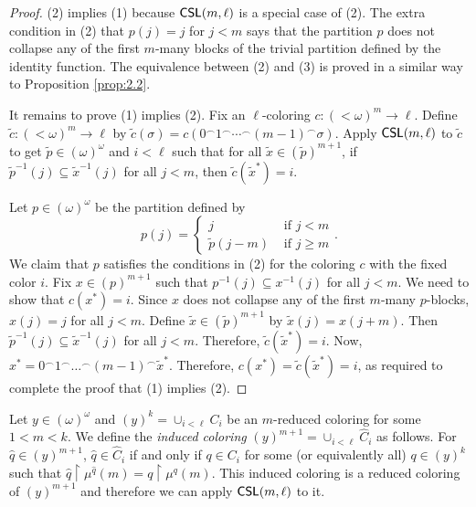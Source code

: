 \documentclass{amsart}
\theoremstyle{definition}
\theoremstyle{remark}
\newcommand{\system}[1]{\mbox{\fontfamily{cmss}\fontshape{n}\fontseries{m}%
    \selectfont#1}}
\newcommand{\CSL}{\system{CSL}}
\newcommand{\concat}{^\smallfrown}
\newcommand{\block}[2]{{#1}^{-1}(#2)}
\begin{document}
\begin{proof}
(2) implies (1) because $\CSL(m,\ell)$ is a special case of (2). The extra condition in (2) that $p(j)=j$ for $j < m$ says that the partition $p$ does not collapse any 
of the first $m$-many blocks of the trivial partition defined by the identity function. The equivalence between (2) and (3) is proved in a similar way to Proposition \ref{prop:2.2}. 

It remains to prove (1) implies (2). Fix an $\ell$-coloring $c: (<\omega)^m \rightarrow \ell$. 
Define $\tilde{c}:(<\omega)^m \rightarrow \ell$ by $\tilde{c}(\sigma) = c(0^{\smallfrown}1^{\smallfrown}\cdots^{\smallfrown}(m-1)^{\smallfrown}\sigma)$. 
Apply $\CSL(m,\ell)$ to $\tilde{c}$ to get $\tilde{p} \in (\omega)^{\omega}$ and $i < \ell$ such that for all $\tilde{x} \in (\tilde{p})^{m+1}$, if 
$\block{\tilde{p}}{j} \subseteq \block{\tilde{x}}{j}$ for all $j<m$, then $\tilde{c}(\tilde{x}^\ast) = i$. 

Let $p \in (\omega)^{\omega}$ be the partition defined by
$$p(j) = \begin{cases} j & \text{ if } j< m \\ \tilde{p}(j-m) &\text{ if } j\geq m\end{cases}.$$
We claim that $p$ satisfies the conditions in (2) for the coloring $c$ with the fixed color $i$.
Fix $x \in (p)^{m+1}$ such that $\block{p}{j} \subseteq \block{x}{j}$ for all $j < m$. We need to show that $c(x^\ast) = i$. 
Since $x$ does not collapse any of the first $m$-many $p$-blocks, 
$x(j)=j$ for all $j < m$.  Define $\tilde x \in (\tilde p)^{m+1}$ by $\tilde x(j) = x(j+m)$.
Then $\block{\tilde{p}}{j} \subseteq 
\block{\tilde{x}}{j}$ for all $j < m$. Therefore, $\tilde{c}(\tilde{x}^\ast) = i$. 
Now, $x^\ast = 0\concat 1 \concat \dots \concat (m-1)\concat \tilde{x}^\ast$.
Therefore, $c(x^\ast) = \tilde{c}(\tilde{x}^\ast) = i$,
as required to complete the proof that (1) implies (2). 
\end{proof}


Let $y \in (\omega)^{\omega}$ and $(y)^k = \cup_{i < \ell} C_i$ be an $m$-reduced coloring for some $1 < m < k$. We define the \textit{induced coloring} 
$(y)^{m+1} = \cup_{i < \ell} \widehat{C}_i$ as follows. For $\widehat{q} \in (y)^{m+1}$, $\widehat{q} \in \widehat{C}_i$ if and only if $q \in C_i$ for some 
(or equivalently all) $q \in (y)^k$ such that $\widehat{q} \upharpoonright \mu^{\widehat{q}}(m) = q \upharpoonright \mu^q(m)$. 
This induced coloring is a reduced coloring of $(y)^{m+1}$ and therefore we 
can apply $\CSL(m,\ell)$ to it. 
\end{document}
